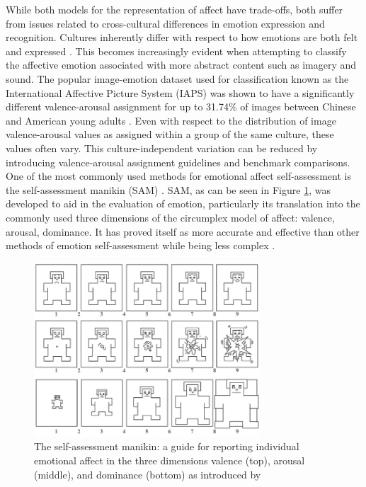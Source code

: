 \documentclass{article}
\begin{document}
While both models for the representation of affect have trade-offs, both suffer from issues related to cross-cultural differences in emotion expression and recognition.
Cultures inherently differ with respect to how emotions are both felt and expressed \citep{markus1991culture}.
This becomes increasingly evident when attempting to classify the affective emotion associated with more abstract content such as imagery and sound.
The popular image-emotion dataset used for classification known as the International Affective Picture System (IAPS) was shown to have a significantly different valence-arousal assignment for up to 31.74\% of images between Chinese and American young adults \citep{huang2015affective}.
Even with respect to the distribution of image valence-arousal values as assigned within a group of the same culture, these values often vary.
This culture-independent variation can be reduced by introducing valence-arousal assignment guidelines and benchmark comparisons.
One of the most commonly used methods for emotional affect self-assessment is the self-assessment manikin (SAM) \citep{lang1980behavioral}.
SAM, as can be seen in Figure \ref{fig:SAM}, was developed to aid in the evaluation of emotion, particularly its translation into the commonly used three dimensions of the circumplex model of affect: valence, arousal, dominance.
It has proved itself as more accurate and effective than other methods of emotion self-assessment while being less complex \citep{bradley1994measuring}.

\begin{figure}[h!]
	\centering
	\includegraphics[width=0.75\textwidth]{images/self-assessment-manikin.png}
	\caption{The self-assessment manikin: a guide for reporting individual emotional affect in the three dimensions valence (top), arousal (middle), and dominance (bottom) as introduced by \citet{lang1980behavioral}}
	\label{fig:SAM}
\end{figure}
\end{document}
